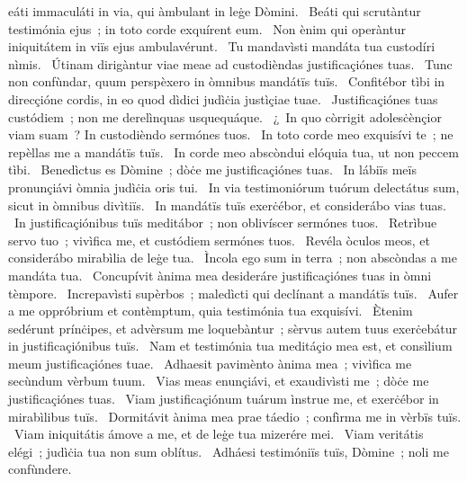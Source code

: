 \psalmChapterWithInscription{}
{ }
{%
eáti immaculáti in via, qui àmbulant in leġe Dòmini. 
~Beáti qui scrutàntur testimónia ejus~; in toto corde exquírent eum. 
~Non ènim qui operàntur iniquitátem in viïs ejus ambulavérunt. 
~Tu mandavìsti mandáta tua custodíri nìmis. 
~Útinam dirigàntur viae meae ad custodièndas justificaçiónes tuas. 
~Tunc non confùndar, quum perspèxero in òmnibus mandátïs tuïs. 
~Confitébor tìbi in direcçióne cordis, in eo quod dìdici judìċia justìçiae tuae. 
~Justificaçiónes tuas custódiem~; non me derelìnquas usquequáque. 
~¿~In quo còrrigit adolesċènçior viam suam~? In custodièndo sermónes tuos. 
~In toto corde meo exquisívi te~; ne repèllas me a mandátïs tuïs. 
~In corde meo abscòndui elóquia tua, ut non peccem tìbi. 
~Benedìctus es Dòmine~; dòċe me justificaçiónes tuas. 
~In lábiïs meïs pronunçiávi òmnia judìċia oris tui. 
~In via testimoniórum tuórum delectátus sum, sicut in òmnibus divìtiïs. 
~In mandátïs tuïs exerċébor, et considerábo vias tuas. 
~In justificaçiónibus tuïs meditábor~; non oblivíscer sermónes tuos. 
~Retrìbue servo tuo~; vivìfica me, et custódiem sermónes tuos. 
~Revéla òculos meos, et considerábo mirabìlia de leġe tua. 
~Ìncola ego sum in terra~; non abscòndas a me mandáta tua. 
~Concupívit ànima mea desideráre justificaçiónes tuas in òmni tèmpore. 
~Increpavìsti supèrbos~; maledìcti qui declínant a mandátïs tuïs. 
~Aufer a me oppróbrium et contèmptum, quia testimónia tua exquisívi. 
~Ètenim sedérunt prínċipes, et advèrsum me loquebàntur~; sèrvus autem tuus exerċebátur in justificaçiónibus tuïs. 
~Nam et testimónia tua meditáçio mea est, et consìlium meum justificaçiónes tuae. 
~Adhaesit pavimènto ànima mea~; vivìfica me secùndum vèrbum tuum. 
~Vias meas enunçiávi, et exaudivìsti me~; dòċe me justificaçiónes tuas. 
~Viam justificaçiónum tuárum ìnstrue me, et exerċébor in mirabìlibus tuïs. 
~Dormitávit ànima mea prae táedio~; confìrma me in vèrbïs tuïs. 
~Viam iniquitátis ámove a me, et de leġe tua mizerére mei. 
~Viam veritátis elégi~; judìċia tua non sum oblítus. 
~Adháesi testimóniïs tuïs, Dòmine~; noli me confùndere. 
}
